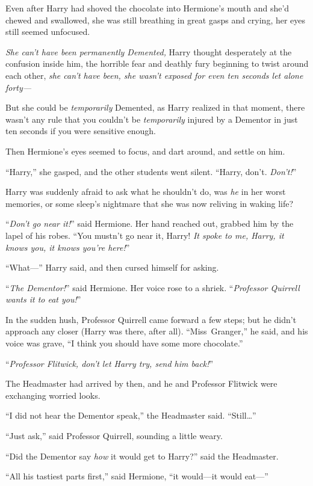 Even after Harry had shoved the chocolate into Hermione’s mouth and she’d chewed and swallowed, she was still breathing in great gasps and crying, her eyes still seemed unfocused.

\emph{She can’t have been permanently Demented,} Harry thought desperately at the confusion inside him, the horrible fear and deathly fury beginning to twist around each other, \emph{she can’t have been, she wasn’t exposed for even ten seconds let alone forty—}

But she could be \emph{temporarily} Demented, as Harry realized in that moment, there wasn’t any rule that you couldn’t be \emph{temporarily} injured by a Dementor in just ten seconds if you were sensitive enough.

Then Hermione’s eyes seemed to focus, and dart around, and settle on him.

“Harry,” she gasped, and the other students went silent. “Harry, don’t. \emph{Don’t!}”

Harry was suddenly afraid to ask what he shouldn’t do, was \emph{he} in her worst memories, or some sleep’s nightmare that she was now reliving in waking life?

“\emph{Don’t go near it!}” said Hermione. Her hand reached out, grabbed him by the lapel of his robes. “You mustn’t go near it, Harry! \emph{It spoke to me, Harry, it knows you, it knows you’re here!}”

“What—” Harry said, and then cursed himself for asking.

“\emph{The Dementor!}” said Hermione. Her voice rose to a shriek. “\emph{Professor Quirrell wants it to eat you!}”

In the sudden hush, Professor Quirrell came forward a few steps; but he didn’t approach any closer (Harry was there, after all). “Miss~Granger,” he said, and his voice was grave, “I think you should have some more chocolate.”

“\emph{Professor Flitwick, don’t let Harry try, send him back!}”

The Headmaster had arrived by then, and he and Professor Flitwick were exchanging worried looks.

“I did not hear the Dementor speak,” the Headmaster said. “Still…”

“Just ask,” said Professor Quirrell, sounding a little weary.

“Did the Dementor say \emph{how} it would get to Harry?” said the Headmaster.

“All his tastiest parts first,” said Hermione, “it would—it would eat—”

